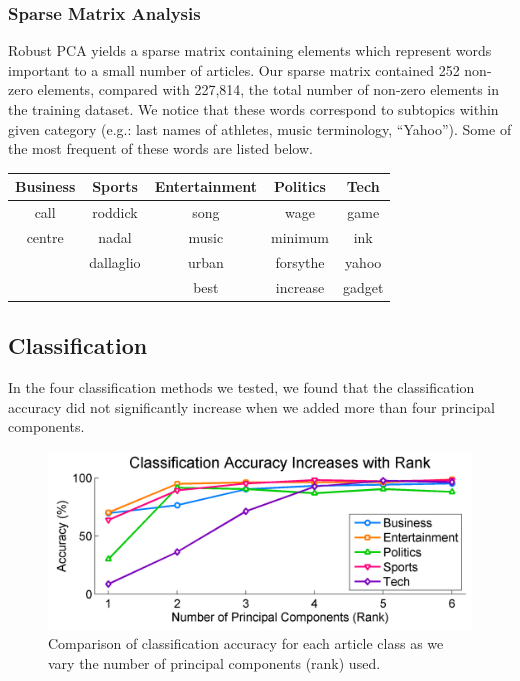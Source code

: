 \documentclass[12pt]{article}
\begin{document}
\subsubsection{Sparse Matrix Analysis}
Robust PCA yields a sparse matrix containing elements which represent words important to a small number of articles. Our sparse matrix contained 252 non-zero elements, compared with 227,814, the total number of non-zero elements in the training dataset. We notice that these words correspond to subtopics within given category (e.g.: last names of athletes, music terminology, “Yahoo”). Some of the most frequent of these words are listed below.

\begin{center}
\begin{tabular}{c c c c c}
{\bf Business} & {\bf Sports} & {\bf Entertainment} & {\bf Politics} & {\bf Tech} \\ \hline
call & roddick & song & wage & game \\
centre & nadal & music & minimum & ink \\
 & dallaglio & urban & forsythe & yahoo \\
 & & best & increase & gadget \\
\end{tabular}
\end{center}


\subsection{Classification}
In the four classification methods we tested, we found that the classification accuracy did not significantly increase when we added more than four principal components.

\begin{figure}[H]
\centering
\includegraphics[width=.6\textwidth]{figures/accuracybyrank}
\caption{Comparison of classification accuracy for each article class as we vary the number of principal components (rank) used.}
\label{class_accuracy}
\end{figure}
\end{document}
